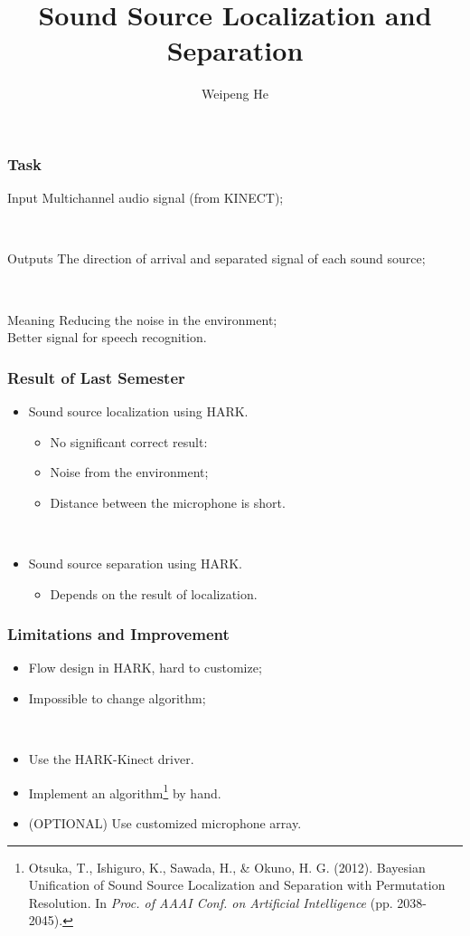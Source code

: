 \documentclass{beamer}
\title{Sound Source Localization and Separation}
\author{Weipeng He}
\begin{document}
\frame{\titlepage}

\begin{frame}
  \frametitle{Task}
  \begin{block}{Input}
  Multichannel audio signal (from KINECT);
  \end{block}
  ~
  \begin{block}{Outputs}
  The direction of arrival and separated signal of each sound source; 
  \end{block}
  ~
  \begin{block}{Meaning}
  Reducing the noise in the environment; \\
  Better signal for speech recognition.
  \end{block}
\end{frame}

\begin{frame}
  \frametitle{Result of Last Semester}
  
  \begin{itemize}
    \item Sound source localization using HARK.
      \begin{itemize}
        \item No significant correct result:
        \item Noise from the environment;
        \item Distance between the microphone is short.
      \end{itemize}
    ~

    \item Sound source separation using HARK.
      \begin{itemize}
        \item Depends on the result of localization.
      \end{itemize}
  \end{itemize}
\end{frame}

\begin{frame}
  \frametitle{Limitations and Improvement}
  
  \begin{itemize}
     \item Flow design in HARK, hard to customize;
     \item Impossible to change algorithm;

     ~
     
     \item Use the HARK-Kinect driver.
     \item Implement an algorithm\footnote{Otsuka, T., Ishiguro, K., Sawada, H., & Okuno, H. G. (2012). Bayesian Unification of Sound Source Localization and Separation with Permutation Resolution. In \textit{Proc. of AAAI Conf. on Artificial Intelligence} (pp. 2038-2045).} by hand.
     \item (OPTIONAL) Use customized microphone array.
  \end{itemize}
  
\end{frame}
\end{document}
